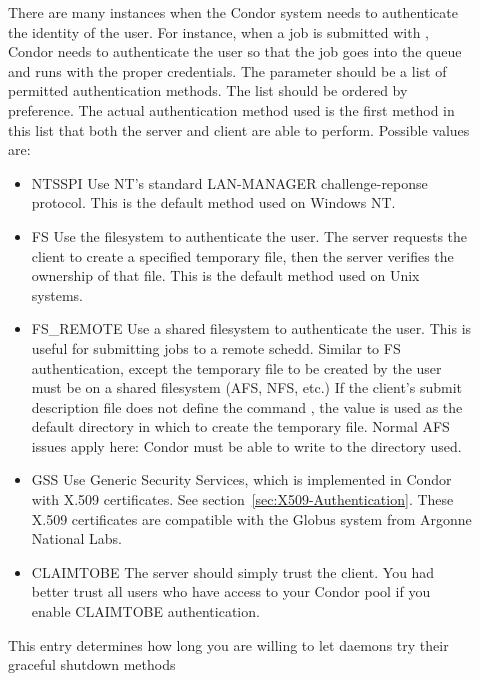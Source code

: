 \begin{description}
\item[]\label{param:AuthenticationMethods}
  There are many instances when the Condor system needs to authenticate
  the identity of the user.  For instance, when a job is submitted with
  , Condor needs to authenticate the user so that the job
  goes into the queue and runs with the proper credentials.  The
   parameter should be a list of
  permitted authentication methods.  The list should be ordered by
  preference.  The actual authentication method used is the first method
  in this list that both the server and client are able to perform.
  Possible values are:
  \begin{itemize}
		\item NTSSPI Use NT's standard LAN-MANAGER challenge-reponse protocol.
			\Note This is the default method used on Windows NT.
		\item FS Use the filesystem to authenticate the user.  
			The server requests the client to create a specified temporary
			file, then the server verifies the ownership of that file. \Note
			This is the default method used on Unix systems.
		\item FS\_REMOTE Use a shared filesystem to authenticate the user.
			This is useful for submitting jobs to a remote schedd.
			Similar to FS authentication, except the temporary file to be
			created by the user must be on a shared filesystem (AFS, NFS, etc.)
			If the client's submit description file does not define the 
			command , the  value is used 
			as the default directory in which to create the temporary file.
			\Note Normal AFS issues apply here: Condor must be able to write
			to the directory used.
		\item GSS Use Generic Security Services, which is implemented in Condor 
			with X.509 certificates. See section~\ref{sec:X509-Authentication}.
			These X.509 certificates are compatible with the Globus system from
			Argonne National Labs.
		\item CLAIMTOBE The server should simply trust the client.  
			\Note You had better trust all users who have access to your Condor
			pool if you enable CLAIMTOBE authentication.
  \end{itemize}

\item[]
  \label{param:ShutdownGracefulTimeout} This entry determines how long
  you are willing to let daemons try their graceful shutdown methods


\end{description}
